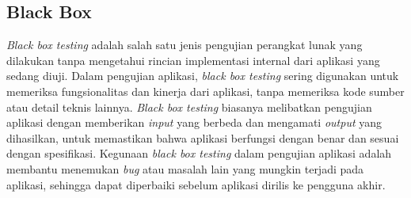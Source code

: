 \subsection{Black Box}
\emph{Black box testing} adalah salah satu jenis pengujian perangkat lunak yang dilakukan tanpa mengetahui rincian implementasi internal dari aplikasi yang sedang diuji. Dalam pengujian aplikasi, \emph{black box testing} sering digunakan untuk memeriksa fungsionalitas dan kinerja dari aplikasi, tanpa memeriksa kode sumber atau detail teknis lainnya.
\emph{Black box testing} biasanya melibatkan pengujian aplikasi dengan memberikan \emph{input} yang berbeda dan mengamati \emph{output} yang dihasilkan, untuk memastikan bahwa aplikasi berfungsi dengan benar dan sesuai dengan spesifikasi. Kegunaan \emph{black box testing} dalam pengujian aplikasi adalah membantu menemukan \emph{bug} atau masalah lain yang mungkin terjadi pada aplikasi, sehingga dapat diperbaiki sebelum aplikasi dirilis ke pengguna akhir. \cite{jem}